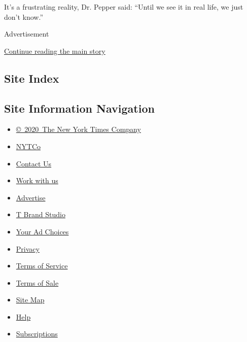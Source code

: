 It's a frustrating reality, Dr. Pepper said: ``Until we see it in real
life, we just don't know.''

Advertisement

\protect\hyperlink{after-bottom}{Continue reading the main story}

\hypertarget{site-index}{%
\subsection{Site Index}\label{site-index}}

\hypertarget{site-information-navigation}{%
\subsection{Site Information
Navigation}\label{site-information-navigation}}

\begin{itemize}
\tightlist
\item
  \href{https://help.nytimes.com/hc/en-us/articles/115014792127-Copyright-notice}{©~2020~The
  New York Times Company}
\end{itemize}

\begin{itemize}
\tightlist
\item
  \href{https://www.nytco.com/}{NYTCo}
\item
  \href{https://help.nytimes.com/hc/en-us/articles/115015385887-Contact-Us}{Contact
  Us}
\item
  \href{https://www.nytco.com/careers/}{Work with us}
\item
  \href{https://nytmediakit.com/}{Advertise}
\item
  \href{http://www.tbrandstudio.com/}{T Brand Studio}
\item
  \href{https://www.nytimes.com/privacy/cookie-policy\#how-do-i-manage-trackers}{Your
  Ad Choices}
\item
  \href{https://www.nytimes.com/privacy}{Privacy}
\item
  \href{https://help.nytimes.com/hc/en-us/articles/115014893428-Terms-of-service}{Terms
  of Service}
\item
  \href{https://help.nytimes.com/hc/en-us/articles/115014893968-Terms-of-sale}{Terms
  of Sale}
\item
  \href{https://spiderbites.nytimes.com}{Site Map}
\item
  \href{https://help.nytimes.com/hc/en-us}{Help}
\item
  \href{https://www.nytimes.com/subscription?campaignId=37WXW}{Subscriptions}
\end{itemize}
